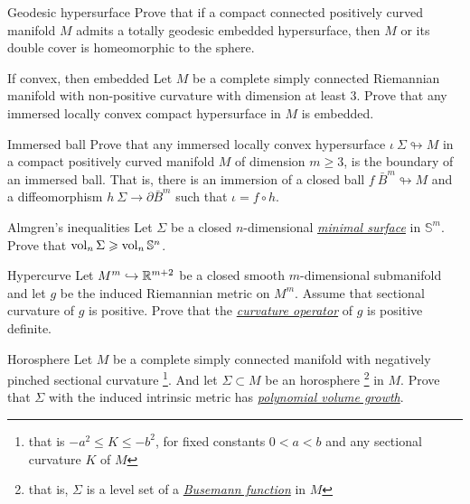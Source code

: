 \documentclass[twoside]{book}
\begin{document}
\begin{pr}{\easy}{Geodesic hypersurface}\label{Geodesic hypersurface}
Prove that 
if a compact connected positively curved manifold $M$ admits a totally geodesic embedded hypersurface,
then $M$ or its double cover is homeomorphic to the sphere.
\end{pr}


\begin{pr}{}{If convex, then embedded}\label{If convex then embedded} Let $M$ be a complete simply connected Riemannian manifold with non-positive curvature with dimension at least $3$.
Prove that any  immersed locally convex
compact hypersurface in $M$ is embedded.
\end{pr}

\begin{pr}{\hard}{Immersed ball}\label{Immersed ball}
Prove that any immersed locally convex
hypersurface $\iota\:\Sigma\looparrowright M$
in a compact positively curved manifold $M$ of dimension $m\ge 3$, is the boundary of an immersed ball. 
That is, there is an immersion of a closed ball $f\:\bar B^m\looparrowright M$ and a diffeomorphism $h\:\Sigma\to\partial \bar B^m$
such that $\iota=f\circ h$.
\end{pr}

\begin{pr}{}{Almgren's inequalities}\label{almgren} 
Let $\Sigma$ be a closed $n$-dimensional 
\hyperref[Minimal surface]{\emph{minimal surface}} 
in $\mathbb{S}^m$.
Prove that
$\operatorname{\rm vol}_n \Sigma\geqslant \operatorname{\rm vol}_n \mathbb{S}^n$.
\end{pr}


\begin{pr}{}{Hypercurve}\label{codim=2}
Let $M^m\hookrightarrow \mathbb{R}^{m+2}$ be a closed smooth $m$-dimensional
submanifold and let  $g$ be the  induced Riemannian metric on $M^m$.
Assume that sectional curvature of $g$ is positive.
Prove that the \hyperref[Curvature operator]{\emph{curvature operator}} of $g$ is positive definite.
\end{pr}

\begin{pr}{}{Horosphere}\label{Horosphere} Let $M$ be a complete simply connected manifold with negatively pin\-ched sectional curvature%
\footnote{that is $-a^2\le K\le -b^2$, for fixed constants $0<a<b$ 
and any sectional  curvature $K$ of $M$}. 
And let $\Sigma\subset M$ be an horosphere%
\footnote{that is, $\Sigma$ is a level set of a 
\hyperref[Busemann function]{\emph{Busemann function}}
in $M$} in $M$.
 Prove that
$\Sigma$ with the induced intrinsic metric 
has \hyperref[Polynomial volume growth]{\emph{polynomial volume growth}}.
\end{pr}
\end{document}
